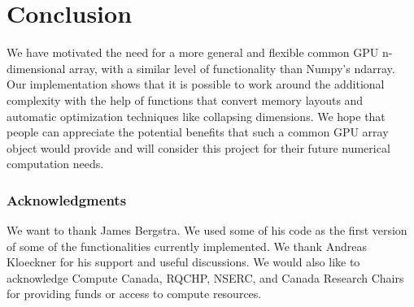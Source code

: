 \documentclass{article} %
\begin{document}

\section{Conclusion}

We have motivated the need for a more general and flexible common GPU n-dimensional array, with a similar level of functionality than Numpy's ndarray.
Our implementation shows that it is possible to work around the additional complexity with the help of functions that convert memory layouts and automatic optimization techniques like collapsing dimensions.
We hope that people can appreciate the potential benefits that such a common GPU array object would provide and will consider this project for their future numerical computation needs.

\subsubsection*{Acknowledgments}

We want to thank James Bergstra. We used some of his code as the first version of some of the functionalities currently implemented. We thank Andreas Kloeckner for his support and useful discussions. We would also like to acknowledge Compute Canada, RQCHP, NSERC, and Canada Research Chairs for providing funds or access to compute resources.




\end{document}

